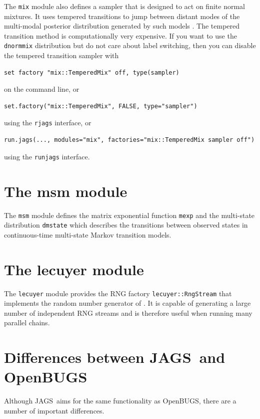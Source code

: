 \documentclass[11pt, a4paper, titlepage]{report}
\newcommand{\JAGS}{\textsf{JAGS}}
\newcommand{\OpenBUGS}{\textsf{OpenBUGS}}
\begin{document}
The \texttt{mix} module also defines a sampler that is designed to act
on finite normal mixtures. It uses tempered transitions to jump
between distant modes of the multi-modal posterior distribution
generated by such models \citep{Neal94,Celeux99}. The tempered
transition method is computationally very expensive. If you want to
use the \texttt{dnormmix} distribution but do not care about label
switching, then you can disable the tempered transition sampler with
\begin{verbatim}
set factory "mix::TemperedMix" off, type(sampler)
\end{verbatim}
on the command line, or
\begin{verbatim}
set.factory("mix::TemperedMix", FALSE, type="sampler")
\end{verbatim}
using the \texttt{rjags} interface, or
\begin{verbatim}
run.jags(..., modules="mix", factories="mix::TemperedMix sampler off")
\end{verbatim}
using the \texttt{runjags} interface.


\chapter{The msm module}

The \texttt{msm} module defines the matrix exponential function
\texttt{mexp} and the multi-state distribution \texttt{dmstate} which
describes the transitions between observed states in continuous-time
multi-state Markov transition models. 

\chapter{The lecuyer module}

The \texttt{lecuyer} module provides the RNG factory
\texttt{lecuyer::RngStream} that implements the random number generator of
\citet{lecuyer02}.  It is capable of generating a large number of
independent RNG streams and is therefore useful when running many
parallel chains.

\appendix

\chapter{Differences between \JAGS\ and \OpenBUGS}

Although \JAGS\ aims for the same functionality as \OpenBUGS, there are
a number of important differences.
\end{document}
